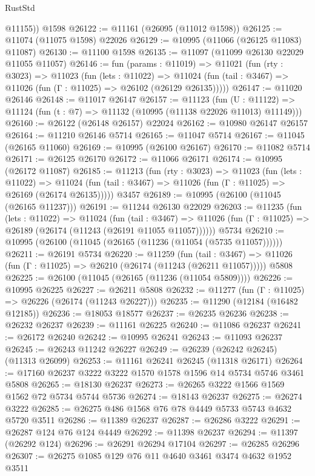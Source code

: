 \begin{lexlean}{RustStd}
\begin{coremodule}
        @11155))
    @1598
@26122 := @11161 (@26095 (@11012 @1598))
@26125 := @11074 (@11075 @1598) @22026
@26129 := @10995 (@11066 (@26125 @11083) @11087)
@26130 := @11100 @1598
@26135 := @11097 (@11099 @26130 @22029 @11055 @11057)
@26146 := fun (params : @11019) =>
  @11021
    (fun (rty : @3023) =>
    @11023
      (fun (lets : @11022) =>
      @11024 (fun (tail : @3467) => @11026 (fun (Γ : @11025) => @26102 (@26129 @26135)))))
@26147 := @11020 @26146
@26148 := @11017 @26147
@26157 := @11123
    (fun (U : @11122) => @11124 (fun (t : @7) => @11132 (@10995 (@11138 @22026 @11013) @11149)))
@26160 := @26122 (@26148 @26157) @22024
@26162 := @10980 @26147 @26157
@26164 := @11210 @26146 @5714
@26165 := @11047 @5714
@26167 := @11045 (@26165 @11060)
@26169 := @10995 (@26100 @26167)
@26170 := @11082 @5714
@26171 := @26125 @26170
@26172 := @11066 @26171
@26174 := @10995 (@26172 @11087)
@26185 := @11213
    (fun (rty : @3023) =>
    @11023
      (fun (lets : @11022) =>
      @11024 (fun (tail : @3467) => @11026 (fun (Γ : @11025) => @26169 (@26174 @26135)))))
    @3457
@26189 := @10995 (@26100 (@11045 (@26165 @11237)))
@26191 := @11244 @26130 @22029
@26203 := @11235
    (fun (lets : @11022) =>
    @11024
      (fun (tail : @3467) =>
      @11026 (fun (Γ : @11025) => @26189 (@26174 (@11243 (@26191 @11055 @11057))))))
    @5734
@26210 := @10995 (@26100 (@11045 (@26165 (@11236 (@11054 (@5735 @11057))))))
@26211 := @26191 @5734
@26220 := @11259
    (fun (tail : @3467) => @11026 (fun (Γ : @11025) => @26210 (@26174 (@11243 (@26211 @11057)))))
    @5808
@26225 := @26100 (@11045 (@26165 (@11236 (@11054 @5809))))
@26226 := @10995 @26225
@26227 := @26211 @5808
@26232 := @11277 (fun (Γ : @11025) => @26226 (@26174 (@11243 @26227)))
@26235 := @11290 (@12184 (@16482 @12185))
@26236 := @18053 @18577
@26237 := @26235 @26236
@26238 := @26232 @26237
@26239 := @11161 @26225
@26240 := @11086 @26237
@26241 := @26172 @26240
@26242 := @10995 @26241
@26243 := @11093 @26237
@26245 := @26243 @11242 @26227
@26249 := @26239 (@26242 @26245) (@11313 @26099)
@26253 := @11161 @26241 @26245 (@11318 @26171)
@26264 := @17160 @26237 @3222 @3222 @1570 @1578 @1596 @14 @5734 @5746 @3461 @5808
@26265 := @18130 @26237
@26273 := @26265 @3222 @1566 @1569 @1562 @72 @5734 @5744 @5736
@26274 := @18143 @26237
@26275 := @26274 @3222
@26285 := @26275 @486 @1568 @76 @78 @4449 @5733 @5743 @4632 @5720 @3511
@26286 := @11389 @26237
@26287 := @26286 @3222
@26291 := @26287 @124 @76 @124 @4449
@26292 := @11398 @26237
@26294 := @11397 (@26292 @124)
@26296 := @26291 @26294 @17104
@26297 := @26285 @26296
@26307 := @26275 @1085 @129 @76 @11 @4640 @3461 @3474 @4632 @1952 @3511

\end{coremodule}
\end{lexlean}
